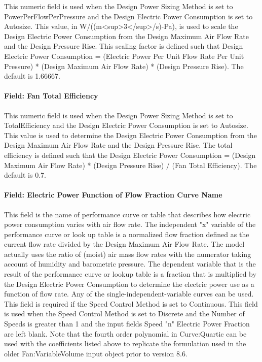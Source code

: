 This numeric field is used when the Design Power Sizing Method is set to PowerPerFlowPerPressure and the Design Electric Power Consumption is set to Autosize.  This value, in W/((m<sup>3</sup>/s)-Pa), is used to scale the Design Electric Power Consumption from the Design Maximum Air Flow Rate and the Design Pressure Rise.  This scaling factor is defined such that Design Electric Power Consumption = (Electric Power Per Unit Flow Rate Per Unit Pressure) * (Design Maximum Air Flow Rate) * (Design Pressure Rise).  The default is 1.66667. 

\paragraph{Field: Fan Total Efficiency}\label{field-total-efficiency-fansysmodel}

This numeric field is used when the Design Power Sizing Method is set to TotalEfficiency and the Design Electric Power Consumption is set to Autosize.  This value is used to determine the Design Electric Power Consumption from the Design Maximum Air Flow Rate and the Design Pressure Rise.  The total efficiency is defined such that the Design Electric Power Consumption = (Design Maximum Air Flow Rate) * (Design Pressure Rise) / (Fan Total Efficiency).  The default is 0.7.

\paragraph{Field: Electric Power Function of Flow Fraction Curve Name}\label{field-power-curve-name-fansysmodel}

This field is the name of performance curve or table that describes how electric power consumption varies with air flow rate.  The independent "x" variable of the performance curve or look up table is a normalized flow fraction defined as the current flow rate divided by the Design Maximum Air Flow Rate.  The model actually uses the ratio of (moist) air mass flow rates with the numerator taking account of humidity and barometric pressure.  The dependent variable that is the result of the performance curve or lookup table is a fraction that is multiplied by the Design Electric Power Consumption to determine the electric power use as a function of flow rate.  Any of the single-independent-variable curves can be used.  This field is required if the Speed Control Method is set to Continuous.  This field is used when the Speed Control Method is set to Discrete and the Number of Speeds is greater than 1 and the input fields Speed "n" Electric Power Fraction are left blank.  Note that the fourth order polynomial in Curve:Quartic can be used with the coefficients listed above to replicate the formulation used in the older Fan:VariableVolume input object prior to version 8.6. 

